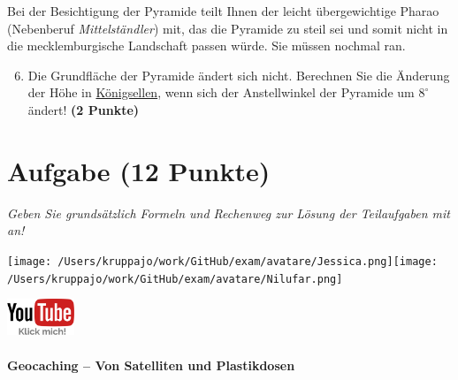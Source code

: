 \documentclass[a4paper, 9pt]{scrartcl}\usepackage[]{graphicx}\usepackage[]{xcolor}
\begin{document}
Bei der Besichtigung der Pyramide teilt Ihnen der leicht übergewichtige Pharao (Nebenberuf \textit{Mittelständler}) mit, das die Pyramide zu steil sei und somit nicht in die mecklemburgische Landschaft passen würde. Sie müssen nochmal ran.

\begin{enumerate}
  \setcounter{enumi}{5}
\item Die Grundfläche der Pyramide ändert sich nicht. Berechnen Sie die Änderung der Höhe in \underline{Königsellen}, wenn sich der Anstellwinkel der Pyramide um $8^\circ$ ändert!  \textbf{(2 Punkte)}
\end{enumerate}



\clearpage

\section{Aufgabe \hfill (12 Punkte)}

\textit{Geben Sie grundsätzlich Formeln und Rechenweg zur Lösung der Teilaufgaben mit an!} \\[1Ex]
 

 
\begin{minipage}[t]{0.5\textwidth}
\texttt{[image: /Users/kruppajo/work/GitHub/exam/avatare/Jessica.png]}\hspace{-4mm}\texttt{[image: /Users/kruppajo/work/GitHub/exam/avatare/Nilufar.png]}
\end{minipage}
\begin{minipage}[t]{0.5\textwidth}
\hfill
\href{https://youtu.be/3LAq3R0rS14}{\includegraphics[width = 2cm]{img/youtube}}
\end{minipage}




\paragraph{Geocaching -- Von Satelliten und Plastikdosen}
\end{document}
